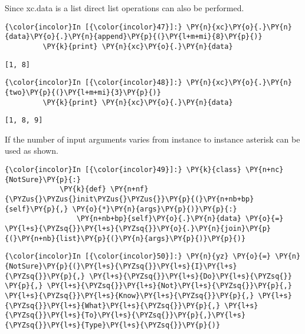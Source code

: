     Since xc.data is a list direct list operations can also be performed.

    \begin{Verbatim}[commandchars=\\\{\}]
{\color{incolor}In [{\color{incolor}47}]:} \PY{n}{xc}\PY{o}{.}\PY{n}{data}\PY{o}{.}\PY{n}{append}\PY{p}{(}\PY{l+m+mi}{8}\PY{p}{)}
         \PY{k}{print} \PY{n}{xc}\PY{o}{.}\PY{n}{data}
\end{Verbatim}

    \begin{Verbatim}[commandchars=\\\{\}]
[1, 8]
    \end{Verbatim}

    \begin{Verbatim}[commandchars=\\\{\}]
{\color{incolor}In [{\color{incolor}48}]:} \PY{n}{xc}\PY{o}{.}\PY{n}{two}\PY{p}{(}\PY{l+m+mi}{3}\PY{p}{)}
         \PY{k}{print} \PY{n}{xc}\PY{o}{.}\PY{n}{data}
\end{Verbatim}

    \begin{Verbatim}[commandchars=\\\{\}]
[1, 8, 9]
    \end{Verbatim}

    If the number of input arguments varies from instance to instance
asterisk can be used as shown.

    \begin{Verbatim}[commandchars=\\\{\}]
{\color{incolor}In [{\color{incolor}49}]:} \PY{k}{class} \PY{n+nc}{NotSure}\PY{p}{:}
             \PY{k}{def} \PY{n+nf}{\PYZus{}\PYZus{}init\PYZus{}\PYZus{}}\PY{p}{(}\PY{n+nb+bp}{self}\PY{p}{,} \PY{o}{*}\PY{n}{args}\PY{p}{)}\PY{p}{:}
                 \PY{n+nb+bp}{self}\PY{o}{.}\PY{n}{data} \PY{o}{=} \PY{l+s}{\PYZsq{}}\PY{l+s}{\PYZsq{}}\PY{o}{.}\PY{n}{join}\PY{p}{(}\PY{n+nb}{list}\PY{p}{(}\PY{n}{args}\PY{p}{)}\PY{p}{)} 
\end{Verbatim}

    \begin{Verbatim}[commandchars=\\\{\}]
{\color{incolor}In [{\color{incolor}50}]:} \PY{n}{yz} \PY{o}{=} \PY{n}{NotSure}\PY{p}{(}\PY{l+s}{\PYZsq{}}\PY{l+s}{I}\PY{l+s}{\PYZsq{}}\PY{p}{,} \PY{l+s}{\PYZsq{}}\PY{l+s}{Do}\PY{l+s}{\PYZsq{}} \PY{p}{,} \PY{l+s}{\PYZsq{}}\PY{l+s}{Not}\PY{l+s}{\PYZsq{}}\PY{p}{,} \PY{l+s}{\PYZsq{}}\PY{l+s}{Know}\PY{l+s}{\PYZsq{}}\PY{p}{,} \PY{l+s}{\PYZsq{}}\PY{l+s}{What}\PY{l+s}{\PYZsq{}}\PY{p}{,} \PY{l+s}{\PYZsq{}}\PY{l+s}{To}\PY{l+s}{\PYZsq{}}\PY{p}{,}\PY{l+s}{\PYZsq{}}\PY{l+s}{Type}\PY{l+s}{\PYZsq{}}\PY{p}{)}
\end{Verbatim}


